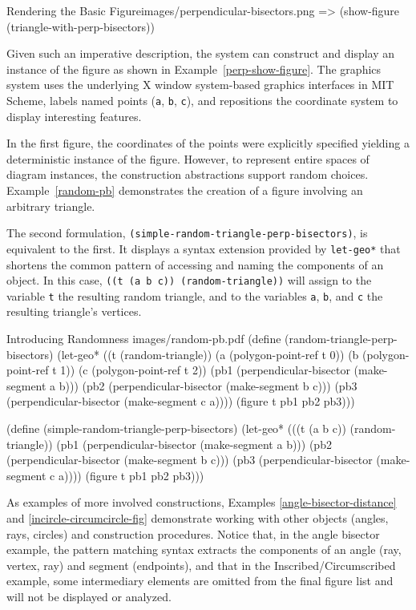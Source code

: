 \begin{img-example}
[label=perp-show-figure]
{Rendering the Basic Figure}{images/perpendicular-bisectors.png}
=> (show-figure (triangle-with-perp-bisectors))
\end{img-example}

Given such an imperative description, the system can construct and
display an instance of the figure as shown in
Example~\ref{perp-show-figure}. The graphics system uses the
underlying X window system-based graphics interfaces in MIT Scheme,
labels named points (\texttt{a}, \texttt{b}, \texttt{c}), and
repositions the coordinate system to display interesting features.

In the first figure, the coordinates of the points were explicitly
specified yielding a deterministic instance of the figure. However, to
represent entire spaces of diagram instances, the construction
abstractions support random choices. Example~\ref{random-pb}
demonstrates the creation of a figure involving an arbitrary
triangle.

The second formulation,
\texttt{(simple-random-triangle-perp-bisectors)}, is equivalent to the
first. It displays a syntax extension provided by \texttt{let-geo*}
that shortens the common pattern of accessing and naming the
components of an object. In this case, \texttt{((t (a b c))
    (random-triangle))} will assign to the variable \texttt{t} the
resulting random triangle, and to the variables \texttt{a},
\texttt{b}, and \texttt{c} the resulting triangle's vertices.

\begin{pdf-example}
[label=random-pb]
{Introducing Randomness}
{images/random-pb.pdf}
(define (random-triangle-perp-bisectors)
  (let-geo* ((t (random-triangle))
             (a (polygon-point-ref t 0))
             (b (polygon-point-ref t 1))
             (c (polygon-point-ref t 2))
             (pb1 (perpendicular-bisector (make-segment a b)))
             (pb2 (perpendicular-bisector (make-segment b c)))
             (pb3 (perpendicular-bisector (make-segment c a))))
    (figure t pb1 pb2 pb3)))

(define (simple-random-triangle-perp-bisectors)
  (let-geo* (((t (a b c)) (random-triangle))
             (pb1 (perpendicular-bisector (make-segment a b)))
             (pb2 (perpendicular-bisector (make-segment b c)))
             (pb3 (perpendicular-bisector (make-segment c a))))
    (figure t pb1 pb2 pb3)))
\end{pdf-example}

As examples of more involved constructions, Examples
\ref{angle-bisector-distance} and \ref{incircle-circumcircle-fig}
demonstrate working with other objects (angles, rays, circles) and
construction procedures. Notice that, in the angle bisector example,
the pattern matching syntax extracts the components of an angle (ray,
vertex, ray) and segment (endpoints), and that in the
Inscribed/Circumscribed example, some intermediary elements are
omitted from the final figure list and will not be displayed or
analyzed.

